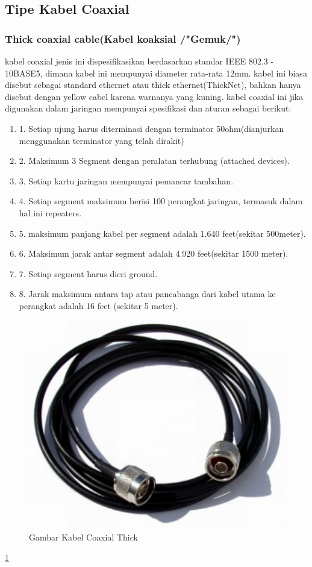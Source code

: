 \begin{itemize}
\begin{itemize}
	\subsection{Tipe Kabel Coaxial}
		\subsubsection{Thick coaxial cable(Kabel koaksial /"Gemuk/")}
		kabel coaxial jenis ini dispesifikasikan berdasarkan standar IEEE 802.3 - 10BASE5, dimana kabel ini mempunyai diameter rata-rata 12mm. kabel ini biasa disebut sebagai standard ethernet atau thick ethernet(ThickNet), bahkan hanya disebut dengan yellow cabel karena warnanya yang kuning.
		kabel coaxial ini jika digunakan dalam jaringan mempunyai spesifikasi dan aturan sebagai berikut:
			\begin{enumerate}
				\item 1. Setiap ujung harus diterminasi dengan terminator 50ohm(dianjurkan menggunakan terminator yang telah dirakit)
				\item 2. Maksimum 3 Segment dengan peralatan terhubung (attached devices).
				\item 3. Setiap kartu jaringan mempunyai pemancar tambahan.
				\item 4. Setiap segment maksimum berisi 100 perangkat jaringan, termasuk dalam hal ini repeaters.
				\item 5. maksimum panjang kabel per segment adalah 1.640 feet(sekitar 500meter).
				\item 6. Maksimum jarak antar segment adalah 4.920 feet(sekitar 1500 meter).
				\item 7. Setiap segment harus dieri ground.
				\item 8. Jarak maksimum antara tap atau pancabanga dari kabel utama ke perangkat adalah 16 feet (sekitar 5 meter).
			\end{enumerate}
\begin{figure} [ht]
	\centerline{\includegraphics[width=1\textwidth]{figures/thickcoax.jpg}}
	\caption{Gambar Kabel Coaxial Thick}
	\label{thickcoax}
\end{figure}
	\ref{thickcoax}

\end{itemize}
\end{itemize}
